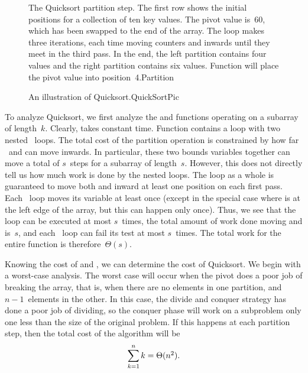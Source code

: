 \begin{figure}
\vspace{-1pt}

{The Quicksort partition step.
The first row shows the initial positions for a collection of ten key
values.
The pivot value is~60, which has been swapped to the end of the array.
The  loop makes three iterations, each time moving counters
 and  inwards until they meet in the third pass.
In the end, the left partition contains four values and the right
partition contains six values.
Function  will place the pivot value into
position~4.}{Partition}
\bigskip\medskip
\end{figure}

\begin{figure}
\vspace{-\bigskipamount}\vspace{-\bigskipamount}
{An illustration of Quicksort.}{QuickSortPic}
\end{figure}

To analyze Quicksort, we first analyze the  and
 functions operating on a subarray of length~\(k\).
Clearly,  takes constant time.
Function  contains a  loop with two
nested \Cwhile\ loops.
The total cost of the partition operation is constrained by
how far ~and  can move inwards.
In particular, these two bounds variables together can move a total of
\(s\)~steps for a subarray of length~\(s\).
However, this does not directly tell us how much work is done by the
nested  loops.
The  loop as a whole is guaranteed to move both  and
 inward at least one position on each first pass.
Each \Cwhile\ loop moves its variable at least once (except in the
special case where  is at the left edge of the
array, but this can happen only once).
Thus, we see that the  loop can be executed at most
\(s\)~times, the total amount of work done moving  and
 is~\(s\), and
each \Cwhile\ loop can fail its test at most \(s\)~times.
The total work for the entire  function is
therefore~\(\Theta(s)\).

Knowing the cost of  and , we
can determine the cost of Quicksort.
We begin with a worst-case analysis.
The worst case will occur when the pivot does a poor job of breaking
the array, that is, when there are no elements in one partition, and
\(n-1\)~elements in the other.
In this case, the divide and conquer
strategy has done a poor job of
dividing, so the conquer phase will work on a subproblem only one
less than the size of the original problem.
If this happens at each partition step, then the total cost of the
algorithm will be
\[\sum_{k=1}^n k = \mbox{$\Theta(n^2)$}. \]

